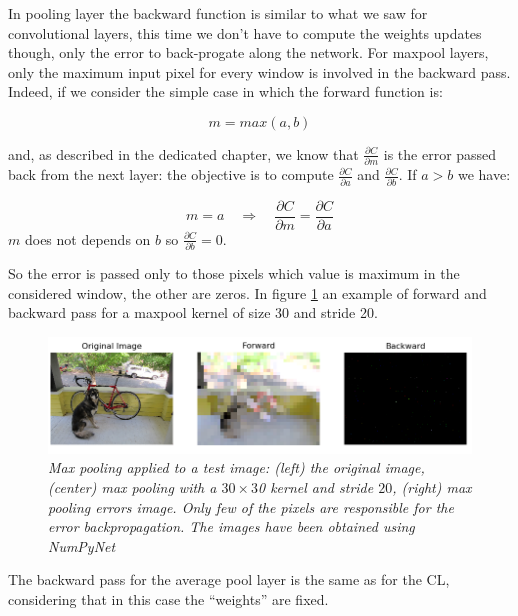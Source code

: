 \documentclass[12pt,a4paper]{report}
\begin{document}
In pooling layer the backward function is similar to what we saw for convolutional layers, this time we don't have to compute the weights updates though, only the error to back-progate along the network.
For maxpool layers, only the maximum input pixel for every window is involved in the backward pass. Indeed, if we consider the simple case in which the forward function is: 

\begin{equation}
 m = max(a, b)
\end{equation}

and, as described in the dedicated chapter, we know that $\frac{\partial C}{\partial m}$ is the error passed back from the next layer: the objective is to compute $\frac{\partial C}{\partial a}$ and $\frac{\partial C}{\partial b}$. 
If $a > b$ we have: 

\begin{equation}
 m = a \quad \Rightarrow \quad \frac{\partial C}{\partial m} = \frac{\partial C}{\partial a}
\end{equation}
$m$ does not depends on $b$ so $\frac{\partial C}{\partial b} = 0$.

So the error is passed only to those pixels which value is maximum in the considered window, the other are zeros. 
In figure \ref{fig:maxpool:ex} an example of forward and backward pass for a maxpool kernel of size 30 and stride 20.

\begin{figure}[H]
 \centering
 \includegraphics[scale=0.53]{./images/maxpool_30_20.png}
 \caption{\it Max pooling applied to a test image: (left) the original image, (center) max pooling with a $30 \times 3$0 kernel and stride $20$, (right) max pooling errors image. Only few of the pixels are responsible for the error backpropagation. 
 The images have been obtained using NumPyNet}
 \label{fig:maxpool:ex}
\end{figure}

The backward pass for the average pool layer is the same as for the CL, considering that in this case the ``weights'' are fixed.

\end{document}

